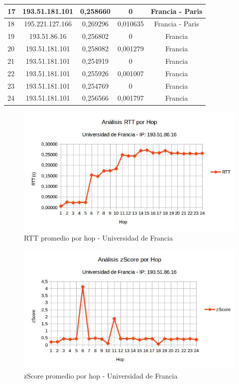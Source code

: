\begin{tabular}{ | l | c | c | c | c |}
  \hline 
   17 & 193.51.181.101 & 0,258660 & 0 & Francia - Paris\\
  \hline 
   18 & 195.221.127.166 & 0,269296 & 0,010635 & Francia - Paris\\
  \hline 
   19 & 193.51.86.16 & 0,256802 & 0 & Francia\\
  \hline 
   20 & 193.51.181.101 & 0,258082 & 0,001279 & Francia\\
  \hline 
   21 & 193.51.181.101 & 0,254919 & 0 & Francia\\
  \hline 
   22 & 193.51.181.101 & 0,255926 & 0,001007 & Francia\\
  \hline 
   23 & 193.51.181.101 & 0,254769 & 0 & Francia\\
  \hline 
   24 & 193.51.181.101 & 0,256566 & 0,001797 & Francia\\    
 \hline 
\end{tabular}

\bigskip

\begin{figure}[H]
\centering
\includegraphics[width=1\textwidth]{graficos/rTT_Francia.jpg}
\caption{RTT promedio por hop - Universidad de Francia}
\label{francia_rtt}
\end{figure}

\begin{figure}[H]
\centering
\includegraphics[width=1\textwidth]{graficos/zScore_Francia.jpg}
\caption{zScore promedio por hop - Universidad de Francia}
\label{francia_zs}
\end{figure}



